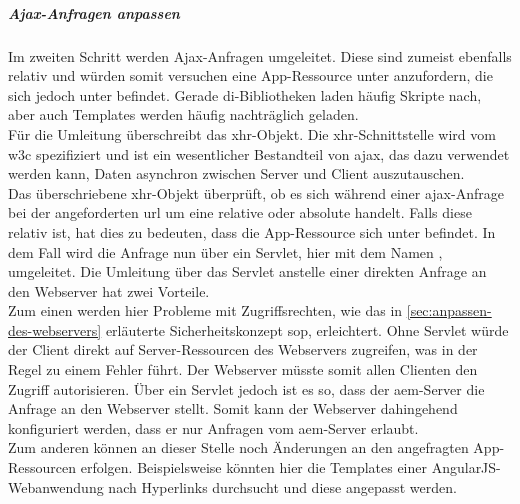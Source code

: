 \subparagraph{Ajax-Anfragen anpassen}
\label{sec:ajax-anfragen-anpassen}

Im zweiten Schritt werden Ajax-Anfragen umgeleitet. Diese sind zumeist ebenfalls relativ und würden somit versuchen eine App-Ressource unter \serverA anzufordern, die sich jedoch unter \serverB befindet. Gerade \ac{di}-Bibliotheken laden häufig Skripte nach, aber auch Templates werden häufig nachträglich geladen. \\
Für die Umleitung überschreibt  das \ac{xhr}-Objekt. Die \ac{xhr}-Schnittstelle wird vom \ac{w3c} spezifiziert und ist ein wesentlicher Bestandteil von \ac{ajax}, das dazu verwendet werden kann, Daten asynchron zwischen Server und Client auszutauschen. \\
Das überschriebene \ac{xhr}-Objekt überprüft, ob es sich während einer \ac{ajax}-Anfrage bei der angeforderten \ac{url} um eine relative oder absolute handelt. Falls diese relativ ist, hat dies zu bedeuten, dass die App-Ressource sich unter \serverB befindet. In dem Fall wird die Anfrage nun über ein Servlet, hier mit dem Namen , umgeleitet. Die Umleitung über das Servlet anstelle einer direkten Anfrage an den Webserver hat zwei Vorteile. \\
Zum einen werden hier Probleme mit Zugriffsrechten, wie das in \autoref{sec:anpassen-des-webservers} erläuterte Sicherheitskonzept \ac{sop}, erleichtert. Ohne Servlet würde der Client direkt auf Server-Ressourcen des Webservers zugreifen, was in der Regel zu einem Fehler führt. Der Webserver müsste somit allen Clienten den Zugriff autorisieren. Über ein Servlet jedoch ist es so, dass der \ac{aem}-Server die Anfrage an den Webserver stellt. Somit kann der Webserver dahingehend konfiguriert werden, dass er nur Anfragen vom \ac{aem}-Server erlaubt.\\
Zum anderen können an dieser Stelle noch Änderungen an den angefragten App-Ressourcen erfolgen. Beispielsweise könnten hier die Templates einer AngularJS-Webanwendung nach Hyperlinks durchsucht und diese angepasst werden.



